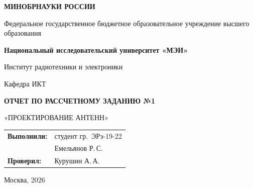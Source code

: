 \begin{titlepage}
    \centering
    {\bfseries МИНОБРНАУКИ РОССИИ\par}
    Федеральное государственное бюджетное образовательное учреждение высшего образования \\
    {\bfseries Национальный исследовательский университет «МЭИ»\par}
    \vspace{1cm}
    Институт радиотехники и электроники\par
    Кафедра ИКТ\par
    \vspace{3cm}
    
    {\bfseries\large ОТЧЕТ ПО РАССЧЕТНОМУ ЗАДАНИЮ №1\par}
    \vspace{0.5cm}
    {\large «ПРОЕКТИРОВАНИЕ АНТЕНН»\par}
    
    
    \vspace{3.5cm}
 \vspace{1.5cm}
\noindent\hfill
\begin{tabular}{@{}ll@{}}
    \textbf{Выполнили:} & студент гр.~ЭРэ-19-22 \\
                        & Емельянов Р.\,С. \\[0.4cm]
    \textbf{Проверил:}  & Курушин А.\,А.
\end{tabular}   
    \vfill
    {Москва, 2026}
\end{titlepage}

